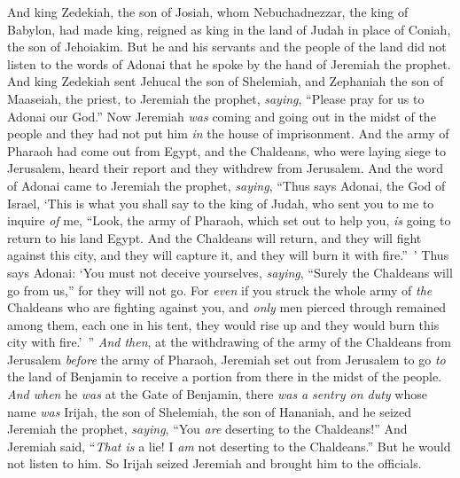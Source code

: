 \begin{biblechapter} %
 And king Zedekiah, the son of Josiah, whom Nebuchadnezzar, the king of Babylon, had made king, reigned as king in the land of Judah in place of Coniah, the son of Jehoiakim.
\verse But he and his servants and the people of the land did not listen to the words of Adonai that he spoke by the hand of Jeremiah the prophet.
\verse And king Zedekiah sent Jehucal the son of Shelemiah, and Zephaniah the son of Maaseiah, the priest, to Jeremiah the prophet, \textit{saying}, “Please pray for us to Adonai our God.”
\verse Now Jeremiah \textit{was} coming and going out in the midst of the people and they had not put him \textit{in} the house of imprisonment.
\verse And the army of Pharaoh had come out from Egypt, and the Chaldeans, who were laying siege to Jerusalem, heard their report and they withdrew from Jerusalem.
\verse And the word of Adonai came to Jeremiah the prophet, \textit{saying},
\verse “Thus says Adonai, the God of Israel, ‘This is what you shall say to the king of Judah, who sent you to me to inquire \textit{of} me, “Look, the army of Pharaoh, which set out to help you, \textit{is} going to return to his land Egypt.
\verse And the Chaldeans will return, and they will fight against this city, and they will capture it, and they will burn it with fire.” ’
\verse Thus says Adonai: ‘You must not deceive yourselves, \textit{saying}, “Surely the Chaldeans will go from us,” for they will not go.
\verse For \textit{even} if you struck the whole army of \textit{the} Chaldeans who are fighting against you, and \textit{only} men pierced through remained among them, each one in his tent, they would rise up and they would burn this city with fire.’ ”
 \textit{And then}, at the withdrawing of the army of the Chaldeans from Jerusalem \textit{before} the army of Pharaoh,
\verse Jeremiah set out from Jerusalem to go \textit{to} the land of Benjamin to receive a portion from there in the midst of the people.
\verse \textit{And when} he \textit{was} at the Gate of Benjamin, there \textit{was} \textit{a sentry on duty} whose name \textit{was} Irijah, the son of Shelemiah, the son of Hananiah, and he seized Jeremiah the prophet, \textit{saying}, “You \textit{are} deserting to the Chaldeans!”
\verse And Jeremiah said, “\textit{That is} a lie! I \textit{am} not deserting to the Chaldeans.” But he would not listen to him. So Irijah seized Jeremiah and brought him to the officials.

\end{biblechapter}
